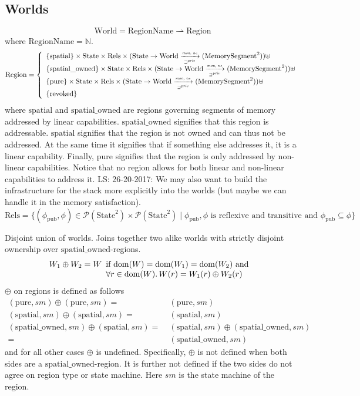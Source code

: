 \documentclass[a3paper]{article}
\newcommand\lau[1]{{\color{purple} \sf \footnotesize {LS: #1}}\\}
\newcommand{\dom}{\mathrm{dom}}
\newcommand{\powerset}[1]{\mathcal{P}(#1)}
\newcommand{\fun}{\rightarrow}
\newcommand{\parfun}{\rightharpoonup}
\newcommand{\tand}{\text{ and }}
\newcommand{\World}{\mathrm{World}}
\newcommand{\RegionName}{\mathrm{RegionName}}
\newcommand{\Region}{\mathrm{Region}}
\newcommand{\spatial}{\mathrm{spatial}}
\newcommand{\spatialo}{\mathrm{spatial\_owned}}
\newcommand{\pure}{\mathrm{pure}}
\newcommand{\revoked}{\mathrm{revoked}}
\newcommand{\State}{\mathrm{State}}
\newcommand{\Rels}{\mathrm{Rels}}
\newcommand{\UPred}[1]{\mathrm(#1)}
\newcommand{\future}{\sqsupseteq}
\newcommand{\pub}{\mathrm{pub}}
\newcommand{\privft}{\future^{\priv}}
\newcommand{\monprivnefun}{\xrightarrow[\text{\tiny{$\privft$}}]{\textit{\tiny{mon, ne}}}}
\newcommand{\nats}{\mathbb{N}}
\newcommand{\shareddom}[1]{\mathrm{#1}}
\newcommand{\MemSeg}{\shareddom{MemorySegment}}
\newcommand{\var}[1]{\mathit{#1}}
\newcommand{\priv}{\var{priv}}
\newcommand{\plainlinearity}[1]{\mathrm{#1}}
\newcommand{\linear}{\plainlinearity{linear}}
\begin{document}
\subsection{Worlds}
\[
  \World = \RegionName \parfun \Region
\]
where $\RegionName = \nats$.
\[
  \Region = \left\{
  \begin{array}{l}
    \{\spatial \} \times \State \times \Rels \times (\State \fun \World \monprivnefun \UPred{\MemSeg^2}) \uplus \\
    \{\spatialo \} \times \State \times \Rels \times (\State \fun \World \monprivnefun \UPred{\MemSeg^2})\uplus \\
    \{\pure \} \times \State \times \Rels \times (\State \fun \World \monprivnefun \UPred{\MemSeg^2}) \uplus\\
    \{\revoked\}
  \end{array} \right.
\]
where $\spatial$ and $\spatialo$ are regions governing segments of memory addressed by linear capabilities. $\spatialo$ signifies that this region is addressable. $\spatial$ signifies that the region is not owned and can thus not be addressed. At the same time it signifies that if something else addresses it, it is a $\linear$ capability. Finally, $\pure$ signifies that the region is only addressed by non-linear capabilities. Notice that no region allows for both linear and non-linear capabilities to address it.
\lau{26-20-2017: We may also want to build the infrastructure for the stack more explicitly into the worlds (but maybe we can handle it in the memory satisfaction).}
  \[
   \Rels = \{(\phi_\pub, \phi) \in \powerset{\State^2}\times \powerset{\State^2} \mid \phi_\pub, \phi \text{ is reflexive and transitive and } \phi_\pub \subseteq \phi \}
  \]


Disjoint union of worlds. Joins together two alike worlds with strictly disjoint ownership over $\spatialo$-regions.
\[
  W_1 \oplus W_2 = W
  \begin{array}[t]{l}
    \text{if $\dom(W) = \dom(W_1) = \dom(W_2) \tand$} \\
    \forall r \in \dom(W) \ldotp W(r) = W_1(r) \oplus W_2(r)
  \end{array}
\]
$\oplus$ on regions is defined as follows
\begin{align*}
  (\pure,\var{sm}) \oplus (\pure,\var{sm}) =  & \; (\pure,\var{sm}) \\
  (\spatial,\var{sm}) \oplus (\spatial,\var{sm}) =  & \; (\spatial,\var{sm}) \\
  (\spatialo,\var{sm}) \oplus (\spatial,\var{sm}) = & \; (\spatial,\var{sm}) \oplus (\spatialo,\var{sm})\\
                                           =  & \; (\spatialo,\var{sm})
\end{align*}
and for all other cases $\oplus$ is undefined. Specifically, $\oplus$ is not defined when both sides are a $\spatialo$-region. It is further not defined if the two sides do not agree on region type or state machine. Here $\var{sm}$ is the state machine of the region.
\end{document}
